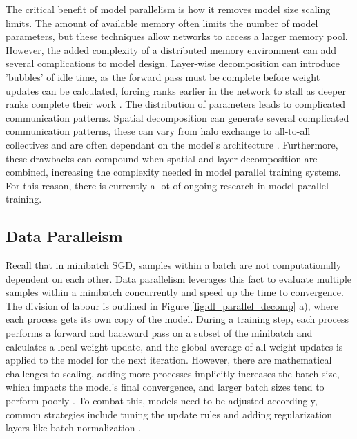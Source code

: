 The critical benefit of model parallelism is how it removes model size scaling limits.
The amount of available memory often limits the number of model parameters, but these techniques allow networks to access a larger memory pool. 
However, the added complexity of a distributed memory environment can add several complications to model design. 
Layer-wise decomposition can introduce 'bubbles' of idle time, as the forward pass must be complete before weight updates can be calculated, forcing ranks earlier in the network to stall as deeper ranks complete their work \cite{Huang2019Gpipe}.
The distribution of parameters leads to complicated communication patterns.
Spatial decomposition can generate several complicated communication patterns, these can vary from halo exchange to all-to-all collectives and are often dependant on the model's architecture \cite{Coates2013DLwithCOTSHPC, Dryden2019ImprvScaleofCNN}.
Furthermore, these drawbacks can compound when spatial and layer decomposition are combined, increasing the complexity needed in model parallel training systems.
For this reason, there is currently a lot of ongoing research in model-parallel training.

\subsection{Data Paralleism}

Recall that in minibatch \gls{SGD}, samples within a batch are not computationally dependent on each other.
Data parallelism leverages this fact to evaluate multiple samples within a minibatch concurrently and speed up the time to convergence.
The division of labour is outlined in Figure \ref{fig:dl_parallel_decomp} a), where each process gets its own copy of the model.
During a training step, each process performs a forward and backward pass on a subset of the minibatch and calculates a local weight update, and the global average of all weight updates is applied to the model for the next iteration.
However, there are mathematical challenges to scaling, adding more processes implicitly increases the batch size, which impacts the model's final convergence, and larger batch sizes tend to perform poorly \cite{Keskar2016LargeBatchTraining}.
To combat this, models need to be adjusted accordingly, common strategies include tuning the update rules and adding regularization layers like batch normalization \cite{You2018ImgNetInMin, Goyal2017FacebookImgNet1Hour}. 

